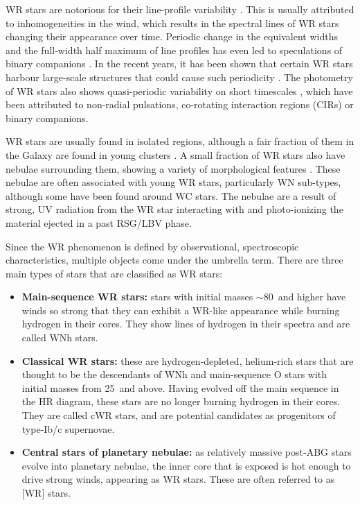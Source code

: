WR stars are notorious for their line-profile variability \citep{lepine_wind_1996,lepine_wind_2000,st-louis_systematic_2009,chene_systematic_2011,chene_clumping_2020}. This is usually attributed to inhomogeneities in the wind, which results in the spectral lines of WR stars changing their appearance over time. Periodic change in the equivalent widths and the full-width half maximum of line profiles has even led to speculations of binary companions \citep[e.g. WR 1][]{morel_investigation_1999}. In the recent years, it has been shown that certain WR stars harbour large-scale structures that could cause such periodicity \citep[e.g.][]{st-louis_measuring_2008,aldoretta_extensive_2016,st-louis_polarization_2018}. The photometry of WR stars also shows quasi-periodic variability on short timescales \citep[e.g.][]{moffat_photometric_1986,balona_intensive_1989,st-louis_brite_2020}, which have been attributed to non-radial pulsations, co-rotating interaction regions (CIRs) or binary companions. 

WR stars are usually found in isolated regions, although a fair fraction of them in the Galaxy are found in young clusters \citep{rosslowe_spatial_2015}. A small fraction of WR stars also have nebulae surrounding them, showing a variety of morphological features \citep{toala_wise_2015}. These nebulae are often associated with young WR stars, particularly WN sub-types, although some have been found around WC stars. The nebulae are a result of strong, UV radiation from the WR star interacting with and photo-ionizing the material ejected in a past RSG/LBV phase. 

Since the WR phenomenon is defined by observational, spectroscopic characteristics, multiple objects come under the umbrella term. There are three main types of stars that are classified as WR stars:

\begin{itemize}
    \item \textbf{Main-sequence WR stars:} stars with initial masses ${\sim}80\,$\Msun{} and higher have winds so strong that they can exhibit a WR-like appearance while burning hydrogen in their cores. They show lines of hydrogen in their spectra and are called WNh stars.
    \item \textbf{Classical WR stars:} these are hydrogen-depleted, helium-rich stars that are thought to be the descendants of WNh and main-sequence O stars with initial masses from 25\,\Msun{} and above. Having evolved off the main sequence in the HR diagram, these stars are no longer burning hydrogen in their cores. They are called cWR stars, and are potential candidates as progenitors of type-Ib/c supernovae. 
    \item \textbf{Central stars of planetary nebulae:} as relatively massive post-ABG stars evolve into planetary nebulae, the inner core that is exposed is hot enough to drive strong winds, appearing as WR stars. These are often referred to as [WR] stars.
\end{itemize}


